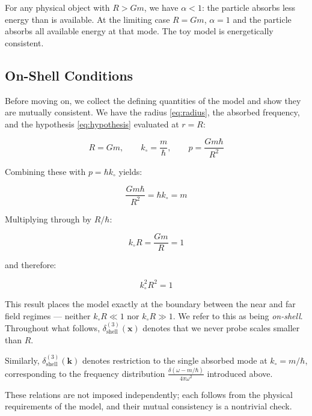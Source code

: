 \documentclass {article}
\renewcommand\vec{\mathbf}
\begin{document}
For any physical object with $R > Gm$, we have $\alpha < 1$: the particle absorbs less energy than is available. At the limiting case $R = Gm$, $\alpha = 1$ and the particle absorbs all available energy at that mode. The toy model is energetically consistent.


\subsection{On-Shell Conditions}

Before moving on, we collect the defining quantities of the model and show they are mutually consistent. We have the radius \eqref{eq:radius}, the absorbed frequency, and the hypothesis \eqref{eq:hypothesis} evaluated at $r = R$:

\begin{equation}
R = Gm, \qquad k_{\circ} = \frac{m}{\hbar}, \qquad p = \frac{Gm\hbar}{R^2}
\end{equation}

Combining these with $p = \hbar k_{\circ}$ yields:

\begin{equation}
\frac{Gm\hbar}{R^2} = \hbar k_{\circ} = m
\end{equation}

Multiplying through by $R/\hbar$:

\begin{equation}
 k_{\circ} R = \frac{Gm}{R} = 1
\end{equation}

and therefore:

\begin{equation}
\boxed{k_{\circ}^2 R^2 = 1}
\label{eq:kr}
\end{equation}

This result places the model exactly at the boundary between the near and far field regimes — neither $k_\circ R \ll 1$ nor $k_\circ R \gg 1$. We refer to this as being \textit{on-shell}. Throughout what follows, $\delta^{(3)}_{\text{shell}}(\vec{x})$ denotes that we never probe scales smaller than $R$.

Similarly, $\delta^{(3)}_{\text{shell}}(\vec{k})$ denotes restriction to the single absorbed mode at $k_\circ = m/\hbar$, corresponding to the frequency distribution $\frac{\delta(\omega - m/\hbar)}{4\pi\omega^2}$ introduced above.

These relations are not imposed independently; each follows from the physical requirements of the model, and their mutual consistency is a nontrivial check.
\end{document}
